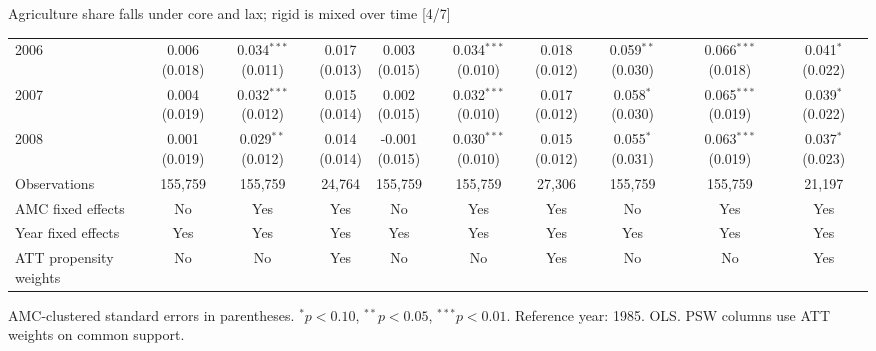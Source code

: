 \documentclass[aspectratio=169]{beamer}
\begin{document}
\begin{frame}{Agriculture share falls under core and lax; rigid is mixed over time [4/7]}
{\begin{tabular}{@{}l*{9}{c}@{}}
2006 & \shortstack{0.006\\(0.018)} & \shortstack{0.034$^{***}$\\(0.011)} & \shortstack{0.017\\(0.013)} & \shortstack{0.003\\(0.015)} & \shortstack{0.034$^{***}$\\(0.010)} & \shortstack{0.018\\(0.012)} & \shortstack{0.059$^{**}$\\(0.030)} & \shortstack{0.066$^{***}$\\(0.018)} & \shortstack{0.041$^{*}$\\(0.022)} \\
2007 & \shortstack{0.004\\(0.019)} & \shortstack{0.032$^{***}$\\(0.012)} & \shortstack{0.015\\(0.014)} & \shortstack{0.002\\(0.015)} & \shortstack{0.032$^{***}$\\(0.010)} & \shortstack{0.017\\(0.012)} & \shortstack{0.058$^{*}$\\(0.030)} & \shortstack{0.065$^{***}$\\(0.019)} & \shortstack{0.039$^{*}$\\(0.022)} \\
2008 & \shortstack{0.001\\(0.019)} & \shortstack{0.029$^{**}$\\(0.012)} & \shortstack{0.014\\(0.014)} & \shortstack{-0.001\\(0.015)} & \shortstack{0.030$^{***}$\\(0.010)} & \shortstack{0.015\\(0.012)} & \shortstack{0.055$^{*}$\\(0.031)} & \shortstack{0.063$^{***}$\\(0.019)} & \shortstack{0.037$^{*}$\\(0.023)} \\
\midrule
Observations & 155,759 & 155,759 & 24,764 & 155,759 & 155,759 & 27,306 & 155,759 & 155,759 & 21,197 \\
AMC fixed effects & No & Yes & Yes & No & Yes & Yes & No & Yes & Yes \\
Year fixed effects & Yes & Yes & Yes & Yes & Yes & Yes & Yes & Yes & Yes \\
ATT propensity weights & No & No & Yes & No & No & Yes & No & No & Yes \\
\bottomrule
\end{tabular}%
}
\vspace{0.1em}
{\tiny\color{ZMidGray} AMC-clustered standard errors in parentheses. $^{*}p<0.10$, $^{**}p<0.05$, $^{***}p<0.01$. Reference year: 1985. OLS. PSW columns use ATT weights on common support.}
\end{frame}
\end{document}
